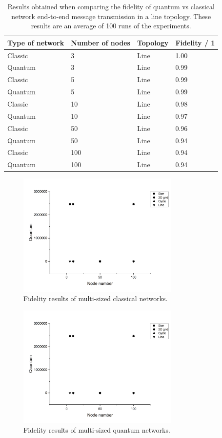 \documentclass{article}
\begin{document}
    \begin{table}[!h] 
    \caption{Results obtained when comparing the fidelity of quantum vs classical network end-to-end message transmission in a line topology. These results are an average of 100 runs of the experiments.}
    \label{table_fidelity} 
    \centering 
    \begin{tabular}{|l || l|  l| l|} 
    \hline 
    Type of network & Number of nodes & Topology & Fidelity / 1 \\
    \hline 
    Classic & 3 & Line & 1.00\\ 
    Quantum & 3 & Line & 0.99\\ 
    Classic & 5 & Line & 0.99\\ 
    Quantum & 5 & Line & 0.99\\ 
    Classic & 10 & Line & 0.98\\ 
    Quantum & 10 & Line & 0.97\\ 
    Classic & 50 & Line & 0.96\\ 
    Quantum & 50 & Line & 0.94\\    
    Classic & 100 & Line & 0.94\\ 
    Quantum & 100 & Line & 0.94\\
    \hline 
    \end{tabular} 
    \end{table} 
    
    \begin{figure}
    \centering
    \includegraphics[width=8cm]{SQ.png}
    \caption{Fidelity results of multi-sized classical networks. \label{f5}} 
    \end{figure}
    
    \begin{figure}
    \centering
    \includegraphics[width=8cm]{SQ.png}
    \caption{Fidelity results of multi-sized quantum networks. \label{f6}} 
    \end{figure}
\end{document}
